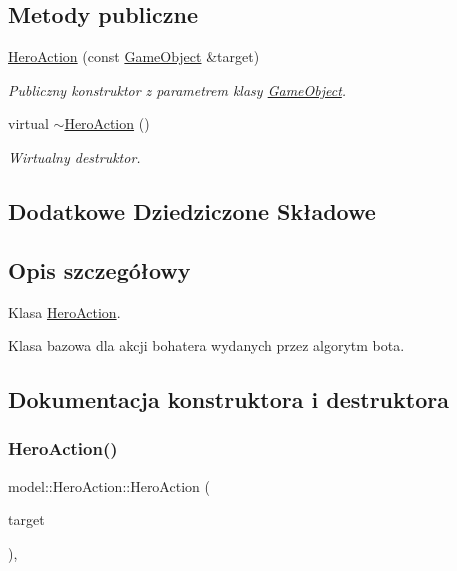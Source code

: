 \subsection*{Metody publiczne}
\begin{DoxyCompactItemize}
\item 
\hyperlink{classmodel_1_1HeroAction_a7ec63672d81f1322090b9f7e5a4fb583}{Hero\+Action} (const \hyperlink{classmodel_1_1GameObject}{Game\+Object} \&target)
\begin{DoxyCompactList}\small\item\em Publiczny konstruktor z parametrem klasy \hyperlink{classmodel_1_1GameObject}{Game\+Object}. \end{DoxyCompactList}\item 
\mbox{\label{classmodel_1_1HeroAction_acfbfe4eb033779b9ca057cc520896136}} 
virtual \hyperlink{classmodel_1_1HeroAction_acfbfe4eb033779b9ca057cc520896136}{$\sim$\+Hero\+Action} ()
\begin{DoxyCompactList}\small\item\em Wirtualny destruktor. \end{DoxyCompactList}\end{DoxyCompactItemize}
\subsection*{Dodatkowe Dziedziczone Składowe}


\subsection{Opis szczegółowy}
Klasa \hyperlink{classmodel_1_1HeroAction}{Hero\+Action}. 

Klasa bazowa dla akcji bohatera wydanych przez algorytm bota. 

\subsection{Dokumentacja konstruktora i destruktora}
\mbox{\label{classmodel_1_1HeroAction_a7ec63672d81f1322090b9f7e5a4fb583}} 
\subsubsection{\texorpdfstring{Hero\+Action()}{HeroAction()}}
{\footnotesize\ttfamily model\+::\+Hero\+Action\+::\+Hero\+Action (\begin{DoxyParamCaption}\item[{const \hyperlink{classmodel_1_1GameObject}{Game\+Object} \&}]{target }\end{DoxyParamCaption})\hspace{0.3cm}{\ttfamily [inline]}, {\ttfamily [explicit]}}



